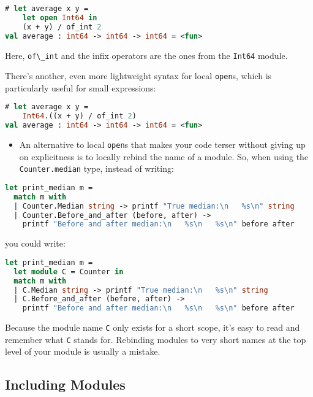 \begin{lstlisting}[language=Caml]
# let average x y =
    let open Int64 in
    (x + y) / of_int 2
val average : int64 -> int64 -> int64 = <fun>
\end{lstlisting}

Here, \passthrough{\lstinline!of\_int!} and the infix operators are the
ones from the \passthrough{\lstinline!Int64!} module.

There's another, even more lightweight syntax for local
\passthrough{\lstinline!open!}s, which is particularly useful for small
expressions:

\begin{lstlisting}[language=Caml]
# let average x y =
    Int64.((x + y) / of_int 2)
val average : int64 -> int64 -> int64 = <fun>
\end{lstlisting}

\begin{itemize}
\tightlist
\item
  An alternative to local \passthrough{\lstinline!open!}s that makes
  your code terser without giving up on explicitness is to locally
  rebind the name of a module. So, when using the
  \passthrough{\lstinline!Counter.median!} type, instead of writing:
\end{itemize}

\begin{lstlisting}[language=Caml]
let print_median m =
  match m with
  | Counter.Median string -> printf "True median:\n   %s\n" string
  | Counter.Before_and_after (before, after) ->
    printf "Before and after median:\n   %s\n   %s\n" before after
\end{lstlisting}

you could write:

\begin{lstlisting}[language=Caml]
let print_median m =
  let module C = Counter in
  match m with
  | C.Median string -> printf "True median:\n   %s\n" string
  | C.Before_and_after (before, after) ->
    printf "Before and after median:\n   %s\n   %s\n" before after
\end{lstlisting}

Because the module name \passthrough{\lstinline!C!} only exists for a
short scope, it's easy to read and remember what
\passthrough{\lstinline!C!} stands for. Rebinding modules to very short
names at the top level of your module is usually a mistake.

\hypertarget{including-modules}{%
\subsection{Including Modules}\label{including-modules}}


